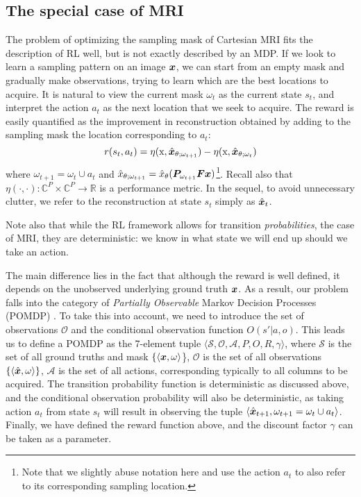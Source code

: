 \subsection{The special case of MRI}
The problem of optimizing the sampling mask of Cartesian MRI fits the description of RL well, but is not exactly described by an MDP. If we look to learn a sampling pattern on an image ${\bm{x}}$, we can start from an empty mask and gradually make observations, trying to learn which are the best locations to acquire. It is natural to view the current mask $\omega_t$ as the current state $s_t$, and interpret the action $a_t$ as the next location that we seek to acquire. The reward is easily quantified as the improvement in reconstruction obtained by adding to the sampling mask the location corresponding to $a_t$:
\begin{equation}
    r(s_t,a_t) = \eta({\textnormal{x}}, \hat{{\bm{x}}}_{\theta; \omega_{t+1}}) - \eta({\textnormal{x}}, \hat{{\bm{x}}}_{\theta; \omega_{t}})\label{eq:reward_mri}
\end{equation}
where $\omega_{t+1} = \omega_t \cup a_t$ and $\hat{x}_{\theta; \omega_{t+1}} = \hat{x}_{\theta}({\bm{P}}_{\omega_{t+1}}{\bm{F}} {\bm{x}})$\footnote{Note that we slightly abuse notation here and use the action $a_t$ to also refer to its corresponding sampling location.}. Recall also that $\eta(\cdot,\cdot): \mathbb{C}^P \times \mathbb{C}^P \to \mathbb{R}$ is a performance metric.
In the sequel, to avoid unnecessary clutter, we refer to the reconstruction at state $s_t$ simply as $\hat{{\bm{x}}}_{t}$.

Note also that while the RL framework allows for transition \textit{probabilities}, the case of MRI, they are deterministic: we know in what state we will end up should we take an action. 

The main difference lies in the fact that although the reward is well defined, it depends on the unobserved underlying ground truth ${\bm{x}}$. As a result, our problem falls into the category of \textit{Partially Observable} Markov Decision Processes (POMDP) \citep{monahan1982state}. To take this into account, we need to introduce the set of observations $\mathcal{O}$ and the conditional observation function $O(s'| a,o)$. This leads us to define a POMDP as the 7-element tuple $\langle \mathcal{S},  \mathcal{O}, \mathcal{A}, P, O, R, \gamma \rangle$, where $\mathcal{S}$ is the set of all ground truths and mask $\{\langle {\bm{x}}, \omega \rangle$\}, $\mathcal{O}$ is the set of all observations $\{\langle \hat{{\bm{x}}}, \omega\rangle\}$, $\mathcal{A}$ is the set of all actions, corresponding typically to all columns to be acquired. The transition probability function is deterministic as discussed above, and the conditional observation probability will also be deterministic, as taking action $a_t$ from state $s_t$ will result in observing the tuple $\langle \hat{{\bm{x}}}_{t+1}, \omega_{t+1} = \omega_t \cup a_t \rangle$. Finally, we have defined the reward function above, and the discount factor $\gamma$ can be taken as a parameter. 

